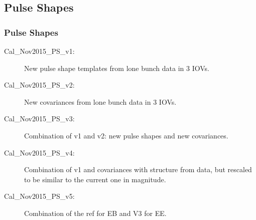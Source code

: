 \documentclass[8pt,serif]{beamer}
\begin{document}
\subsection{Pulse Shapes}
\begin{frame}
\frametitle{Pulse Shapes}

\vspace{10mm}
\begin{description}
\item [Cal\_Nov2015\_PS\_v1:] New pulse shape templates from lone bunch data in 3 IOVs. \\
\vspace{3mm}
 \href{https://github.com/ECALELFS/ECALELF/blob/2106bb440a50db29c74f51f9403609319e7bd171/EcalAlCaRecoProducers/config/reRecoTags/Cal_Nov2015_PS_v1.py}{}
\vspace{5mm}
\item [Cal\_Nov2015\_PS\_v2:] New covariances  from lone bunch data in 3 IOVs. \\
\vspace{3mm}
 \href{https://github.com/ECALELFS/ECALELF/blob/2106bb440a50db29c74f51f9403609319e7bd171/EcalAlCaRecoProducers/config/reRecoTags/Cal_Nov2015_PS_v2.py}{}
\vspace{5mm}
\item [Cal\_Nov2015\_PS\_v3:] Combination of v1 and v2: new pulse shapes and new covariances. \\
\vspace{3mm}
 \href{https://github.com/ECALELFS/ECALELF/blob/2106bb440a50db29c74f51f9403609319e7bd171/EcalAlCaRecoProducers/config/reRecoTags/Cal_Nov2015_PS_v3.py}{}
\vspace{5mm}
\item [Cal\_Nov2015\_PS\_v4:] Combination of v1 and covariances with structure from data, but rescaled to be similar to the current one in magnitude.\\
\vspace{3mm}
 \href{https://github.com/ECALELFS/ECALELF/blob/2106bb440a50db29c74f51f9403609319e7bd171/EcalAlCaRecoProducers/config/reRecoTags/Cal_Nov2015_PS_v4.py}{}
\item [Cal\_Nov2015\_PS\_v5:] Combination of the ref for EB and V3 for EE.\\
\vspace{3mm}
 \href{https://github.com/ECALELFS/ECALELF/blob/newMaster/EcalAlCaRecoProducers/config/reRecoTags/Cal_Nov2015_PS_v5.py}{}
	\end{description}

\end{frame}
\end{document}
